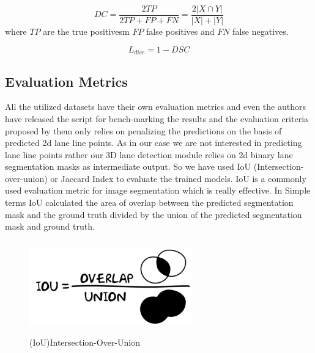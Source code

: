        \begin{equation}
            DC = \frac{2TP}{2TP + FP + FN} = \frac{2|X \cap Y|}{|X| + |Y|}
        \end{equation}
    where $TP$ are the true positivesm $FP$ false positives and $FN$ false negatives.  
        
        \begin{equation}
            L_{dice} = 1 - DSC
        \end{equation}
        
        \subsection{Evaluation Metrics}
        All the utilized datasets have their own evaluation metrics and even the authors have released the script for bench-marking the results and the evaluation criteria proposed by them only relies on penalizing the predictions on the basis of predicted 2d lane line points. As in our case we are not interested in predicting lane line points rather our 3D lane detection module relies on 2d binary lane segmentation masks as intermediate output. So we have used IoU (Intersection-over-union) or Jaccard Index to evaluate the trained models. IoU is a commonly used evaluation metric for image segmentation which is really effective. In Simple terms IoU calculated the area of overlap between the predicted segmentation mask and the ground truth divided by the union of the predicted segmentation mask and ground truth.
        
         \begin{figure}[h]
    \centering
    \includegraphics[width=7cm, height=4cm]{images/IOU.png}
    \caption{(IoU)Intersection-Over-Union \footnotemark}
    \end{figure}
        
